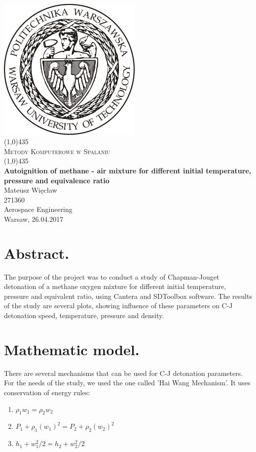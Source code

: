 \documentclass[11pt]{article}
\begin{document}
\begin{titlepage}

	\begin{center}
    \includegraphics[width=7cm]{Logo-PW-duze.jpg} \\
    [10mm]
	\line(1,0){435} \\
	[8mm]
	\huge{\textsc{Metody Komputerowe w Spalaniu}} \\
	\line(1,0){435} \\
	[15mm]
    \LARGE{\textbf{Autoignition of methane - air mixture for different initial temperature, pressure and equivalence ratio}} \\
	[50mm]
	\Large{Mateusz Więcław}\\
    \Large{271360}\\
    [25mm]
    \large{Aerospace Engineering}\\
    [3mm]
    \large{Warsaw, 26.04.2017}\\
    \end{center}
    
\end{titlepage}

\newpage

\section{Abstract.}
The purpose of the project was to conduct a study of Chapman-Jouget detonation of a methane oxygen mixture for different initial temperature, pressure and equivalent ratio, using Cantera and SDToolbox software. The results of the study are several plots, showing influence of these parameters on C-J detonation speed, temperature, pressure and density.

\section{Mathematic model.}
There are several mechanisms that can be used for C-J detonation parameters. For the needs of the study, we used the one called 'Hai Wang Mechanism'. It uses conservation of energy rules:\\
\begin{enumerate}
\item \(\rho_1 w_1 = \rho_2 w_2\)
\item \(P_1 + \rho_1 (w_1)^2 = P_2 + \rho_2 (w_2)^2\)
\item \(h_1 +  {w_1^2}/2 = h_2 +  {w_2^2}/2\)
\end{enumerate}
\end{document}
